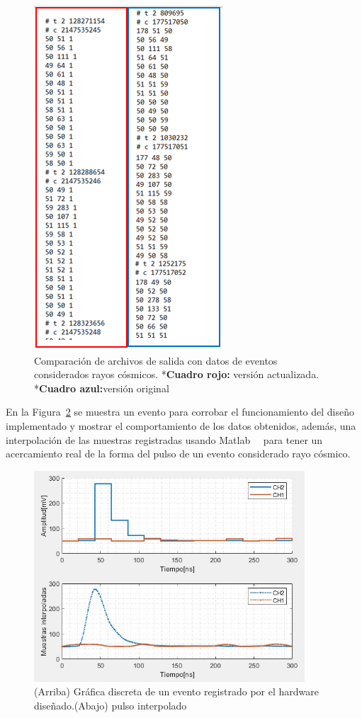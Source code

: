 \begin{figure}[H]
\includegraphics[scale=0.9]{Figs/eventos.PNG} 
\centering
\caption[Comparación de archivos de salida con datos de eventos considerados rayos cósmicos]{Comparación de archivos de salida con datos de eventos considerados rayos cósmicos. *\textbf{Cuadro rojo:} versión actualizada. *\textbf{Cuadro azul:}versión original}
\label{mta}
\end{figure}


En la Figura~\ref{adecuacion} se muestra un evento para corrobar el funcionamiento del diseño implementado y mostrar el comportamiento de los datos obtenidos, además, una interpolación de las muestras registradas usando Matlab~\textregistered~ para tener un acercamiento real de la forma del pulso de un evento considerado rayo cósmico.

\begin{figure}[H]
\includegraphics[width=0.9\textwidth]{Figs/salidadata.jpeg} 
\centering
\caption[Gráfica de evento hardware vs pulso interpolado]{(Arriba) Gráfica discreta de un evento registrado por el hardware diseñado.(Abajo) pulso interpolado}
\label{adecuacion}
\end{figure}

